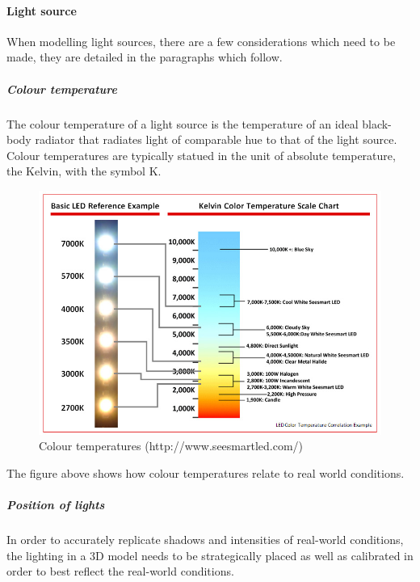 \documentclass[11pt,a4paper]{report}
\begin{document}
				\paragraph{Light source}
					When modelling light sources, there are a few considerations which need to be made, they are detailed in the paragraphs which follow.
					\subparagraph{Colour temperature}
						The colour temperature of a light source is the temperature of an ideal black-body radiator that radiates light of comparable hue to that of the light source. Colour temperatures are typically statued in the unit of absolute temperature, the Kelvin, with the symbol K.
						\begin{figure}[H]
							\centering
							\includegraphics[width=1\textwidth]{colour_temperature}
							\caption{Colour temperatures (http://www.seesmartled.com/)}
						\end{figure}
						The figure above shows how colour temperatures relate to real world conditions.
				
					\subparagraph{Position of lights}
						In order to accurately replicate shadows and intensities of real-world conditions, the lighting in a 3D model needs to be strategically placed as well as calibrated in order to best reflect the real-world conditions.
						
\end{document}
